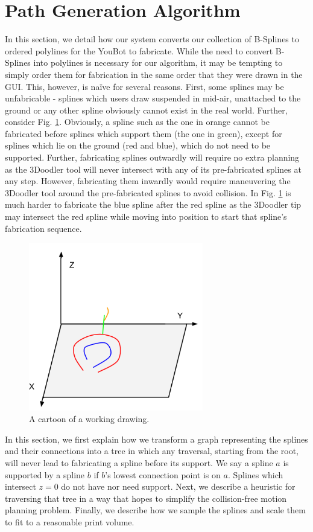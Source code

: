 \documentclass[conference]{acmsiggraph}
\begin{document}
\section{Path Generation Algorithm}
In this section, we detail how our system converts our collection of B-Splines to ordered polylines for the YouBot to fabricate.  While the need to convert B-Splines into polylines is necessary for our algorithm, it may be tempting to simply order them for fabrication in the same order that they were drawn in the GUI.  This, however, is naïve for several reasons.  First, some splines may be unfabricable - splines which users draw suspended in mid-air, unattached to the ground or any other spline obviously cannot exist in the real world.  Further, consider Fig. \ref{fig:splines}.  Obviously, a spline such as the one in orange cannot be fabricated before splines which support them (the one in green), except for splines which lie on the ground (red and blue), which do not need to be supported.  Further, fabricating splines outwardly will require no extra planning as the 3Doodler tool will never intersect with any of its pre-fabricated splines at any step.  However, fabricating them inwardly would require maneuvering the 3Doodler tool around the pre-fabricated splines to avoid collision.  In Fig. \ref{fig:splines} is much harder to fabricate the blue spline after the red spline as the 3Doodler tip may intersect the red spline while moving into position to start that spline's fabrication sequence.

\begin{figure}[t]
\centering
\includegraphics[width=3.0in]{images/Splines.png}
\caption{A cartoon of a working drawing.}
\label{fig:splines}
\end{figure}

In this section, we first explain how we transform a graph representing the splines and their connections into a tree in which any traversal, starting from the root, will never lead to fabricating a spline before its support.  We say a spline $a$ is supported by a spline $b$ if $b$'s lowest connection point is on $a$.  Splines which intersect $z=0$ do not have nor need support.  Next, we describe a heuristic for traversing that tree in a way that hopes to simplify the collision-free motion planning problem.  Finally, we describe how we sample the splines and scale them to fit to a reasonable print volume.
\end{document}
